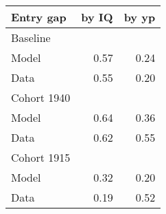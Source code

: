 \begin{tabular}{lrr}
\hline
Entry gap & by IQ  & by yp  \\
\hline
Baseline &   &   \\
Model & 0.57  & 0.24  \\
Data & 0.55  & 0.20  \\
Cohort 1940 &   &   \\
Model & 0.64  & 0.36  \\
Data & 0.62  & 0.55  \\
Cohort 1915 &   &   \\
Model & 0.32  & 0.20  \\
Data & 0.19  & 0.52  \\
\hline
\end{tabular}%

